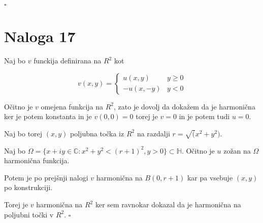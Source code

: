 \documentclass[12pt]{article}
\begin{document}
$\square$


\section{Naloga 17}
Naj bo $v$ funckija definirana na $R^2$ kot

\[ v(x,y) = \begin{cases} 
      u(x,y) & y\geq 0 \\
      -u(x,-y) & y < 0
   \end{cases}
\]

Očitno je $v$ omejena funkcija na $R^2$, zato je dovolj da dokažem da je harmonična ker je potem konstanta in je $v(0,0)=0$ torej je $v=0$ in je potem tudi $u=0$. 

Naj bo torej $(x, y)$ poljubna točka iz $R^2$ na razdalji $r=\sqrt(x^2+y^2)$. 

Naj bo $\Omega = \{x+iy\in \mathbb{C}: x^2+y^2<(r+1)^2, y>0\}\subset \mathbb{H}$. Očitno je $u$ zožan na $\Omega$ harmonična funkcija.

Potem je po prejšnji nalogi $v$ harmonična na $B(0, r+1)$ kar pa vsebuje $(x, y)$ po konstrukciji.

Torej je $v$ harmonična na $R^2$ ker sem ravnokar dokazal da je harmonična na poljubni točki v $R^2$. $\square$
\end{document}
